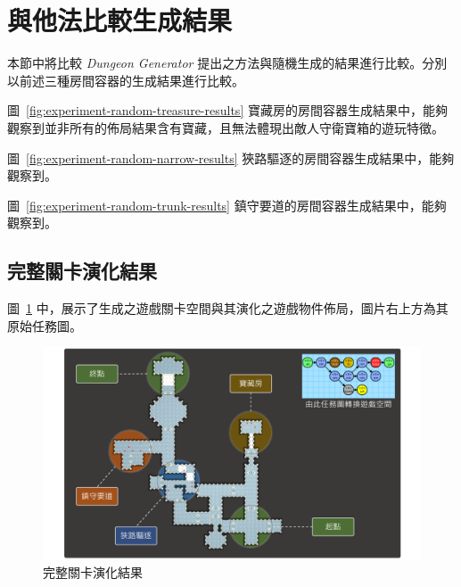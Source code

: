\clearpage

\section{與他法比較生成結果}
\label{sec:experiment-comparison}

本節中將比較 \textit{Dungeon Generator} 提出之方法與隨機生成的結果進行比較。分別以前述三種房間容器的生成結果進行比較。

圖~\ref{fig:experiment-random-treasure-results} 寶藏房的房間容器生成結果中，能夠觀察到並非所有的佈局結果含有寶藏，且無法體現出敵人守衛寶箱的遊玩特徵。

圖~\ref{fig:experiment-random-narrow-results} 狹路驅逐的房間容器生成結果中，能夠觀察到。

圖~\ref{fig:experiment-random-trunk-results} 鎮守要道的房間容器生成結果中，能夠觀察到。





\begin{landscape}
  \section{完整關卡演化結果}
  \label{sec:experiment-overall}

  圖~\ref{fig:experiment-overall-evolution} 中，展示了生成之遊戲關卡空間與其演化之遊戲物件佈局，圖片右上方為其原始任務圖。

  \begin{figure}[H]
    \begin{center}
      \includegraphics[width=0.72\linewidth]{figures/experiments/experiment-overall-evolution.pdf}
      \caption{完整關卡演化結果}
      \label{fig:experiment-overall-evolution}
    \end{center}
  \end{figure}
\end{landscape}

